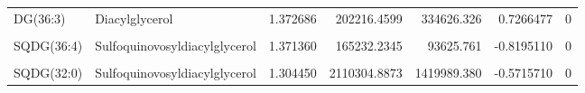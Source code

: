 \begin{table}[!h]
\begin{tabular}[t]{llrrrrr}
\addlinespace
DG(36:3) & Diacylglycerol & 1.372686 & 202216.4599 & 334626.326 & 0.7266477 & 0\\
\cellcolor{gray!10}{PC(36:3)} & \cellcolor{gray!10}{Glycerophosphocholine} & \cellcolor{gray!10}{1.372089} & \cellcolor{gray!10}{3850236.8324} & \cellcolor{gray!10}{2005066.790} & \cellcolor{gray!10}{-0.9412966} & \cellcolor{gray!10}{0}\\
SQDG(36:4) & Sulfoquinovosyldiacylglycerol & 1.371360 & 165232.2345 & 93625.761 & -0.8195110 & 0\\
\cellcolor{gray!10}{MG(20:4)} & \cellcolor{gray!10}{Monoacylglycerol} & \cellcolor{gray!10}{1.356038} & \cellcolor{gray!10}{294.1179} & \cellcolor{gray!10}{6726.151} & \cellcolor{gray!10}{4.5106325} & \cellcolor{gray!10}{0}\\
SQDG(32:0) & Sulfoquinovosyldiacylglycerol & 1.304450 & 2110304.8873 & 1419989.380 & -0.5715710 & 0\\
\bottomrule
\end{tabular}
\end{table}